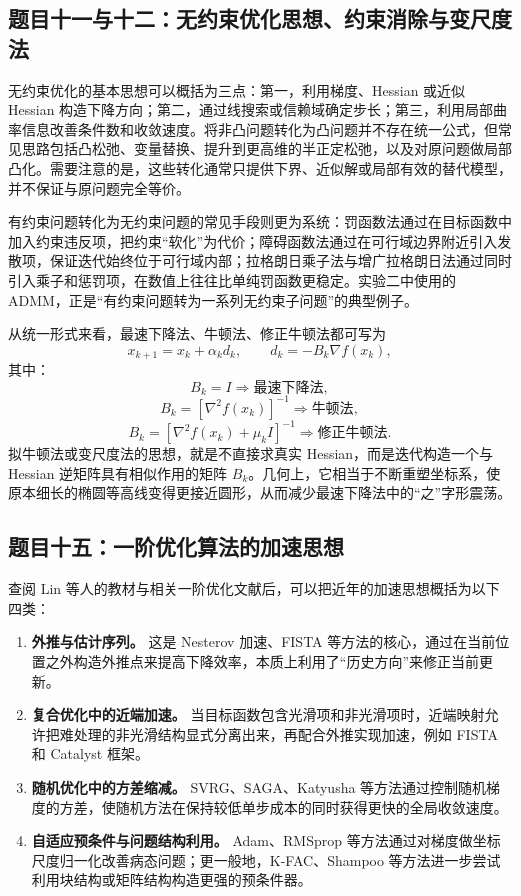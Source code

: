 \documentclass[UTF8,a4paper,12pt,fontset=none]{ctexart}
\begin{document}
\subsection{题目十一与十二：无约束优化思想、约束消除与变尺度法}

无约束优化的基本思想可以概括为三点：第一，利用梯度、Hessian 或近似 Hessian 构造下降方向；第二，通过线搜索或信赖域确定步长；第三，利用局部曲率信息改善条件数和收敛速度。将非凸问题转化为凸问题并不存在统一公式，但常见思路包括凸松弛、变量替换、提升到更高维的半正定松弛，以及对原问题做局部凸化。需要注意的是，这些转化通常只提供下界、近似解或局部有效的替代模型，并不保证与原问题完全等价。

有约束问题转化为无约束问题的常见手段则更为系统：罚函数法通过在目标函数中加入约束违反项，把约束“软化”为代价；障碍函数法通过在可行域边界附近引入发散项，保证迭代始终位于可行域内部；拉格朗日乘子法与增广拉格朗日法通过同时引入乘子和惩罚项，在数值上往往比单纯罚函数更稳定。实验二中使用的 ADMM，正是“有约束问题转为一系列无约束子问题”的典型例子。

从统一形式来看，最速下降法、牛顿法、修正牛顿法都可写为
\[
x_{k+1}=x_k+\alpha_k d_k,\qquad d_k=-B_k\nabla f(x_k),
\]
其中：
\[
B_k=I \Rightarrow \text{最速下降法},
\]
\[
B_k=[\nabla^2 f(x_k)]^{-1} \Rightarrow \text{牛顿法},
\]
\[
B_k=[\nabla^2 f(x_k)+\mu_k I]^{-1} \Rightarrow \text{修正牛顿法}.
\]
拟牛顿法或变尺度法的思想，就是不直接求真实 Hessian，而是迭代构造一个与 Hessian 逆矩阵具有相似作用的矩阵 $B_k$。几何上，它相当于不断重塑坐标系，使原本细长的椭圆等高线变得更接近圆形，从而减少最速下降法中的“之”字形震荡。

\subsection{题目十五：一阶优化算法的加速思想}

查阅 Lin 等人的教材与相关一阶优化文献后，可以把近年的加速思想概括为以下四类：

\begin{enumerate}
\item \textbf{外推与估计序列。} 这是 Nesterov 加速、FISTA 等方法的核心，通过在当前位置之外构造外推点来提高下降效率，本质上利用了“历史方向”来修正当前更新。
\item \textbf{复合优化中的近端加速。} 当目标函数包含光滑项和非光滑项时，近端映射允许把难处理的非光滑结构显式分离出来，再配合外推实现加速，例如 FISTA 和 Catalyst 框架。
\item \textbf{随机优化中的方差缩减。} SVRG、SAGA、Katyusha 等方法通过控制随机梯度的方差，使随机方法在保持较低单步成本的同时获得更快的全局收敛速度。
\item \textbf{自适应预条件与问题结构利用。} Adam、RMSprop 等方法通过对梯度做坐标尺度归一化改善病态问题；更一般地，K-FAC、Shampoo 等方法进一步尝试利用块结构或矩阵结构构造更强的预条件器。
\end{enumerate}
\end{document}
